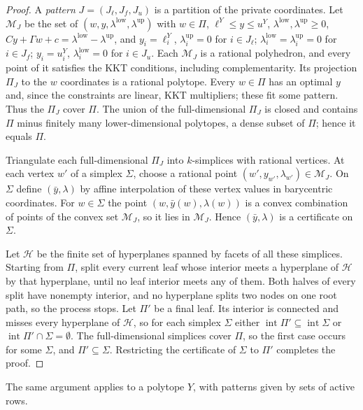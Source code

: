 \begin{proof}
A \emph{pattern} $J=(J_\ell,J_f,J_u)$ is a partition of the private
coordinates. Let $\mathcal M_J$ be the set of
$(w,y,\lambda^{\mathrm{low}},\lambda^{\mathrm{up}})$ with $w\in\Pi$,
$\ell^Y\le y\le u^Y$, $\lambda^{\mathrm{low}},\lambda^{\mathrm{up}}\ge0$,
$Cy+\Gamma w+c=\lambda^{\mathrm{low}}-\lambda^{\mathrm{up}}$, and
$y_i=\ell^Y_i$, $\lambda^{\mathrm{up}}_i=0$ for $i\in J_\ell$;
$\lambda^{\mathrm{low}}_i=\lambda^{\mathrm{up}}_i=0$ for $i\in J_f$;
$y_i=u^Y_i$, $\lambda^{\mathrm{low}}_i=0$ for $i\in J_u$. Each
$\mathcal M_J$ is a rational polyhedron, and every point of it satisfies the
KKT conditions, including complementarity. Its projection $\Pi_J$ to the $w$
coordinates is a rational polytope. Every $w\in\Pi$ has an optimal $y$ and,
since the constraints are linear, KKT multipliers; these fit some pattern.
Thus the $\Pi_J$ cover $\Pi$. The union of the full-dimensional $\Pi_J$ is
closed and contains $\Pi$ minus finitely many lower-dimensional polytopes, a
dense subset of $\Pi$; hence it equals $\Pi$.

Triangulate each full-dimensional $\Pi_J$ into $k$-simplices with rational
vertices. At each vertex $w'$ of a simplex $\Sigma$, choose a rational point
$(w',y_{w'},\lambda_{w'})\in\mathcal M_J$. On $\Sigma$ define
$(\bar y,\lambda)$ by affine interpolation of these vertex values in
barycentric coordinates. For $w\in\Sigma$ the point
$(w,\bar y(w),\lambda(w))$ is a convex combination of points of the convex
set $\mathcal M_J$, so it lies in $\mathcal M_J$. Hence $(\bar y,\lambda)$ is
a certificate on $\Sigma$.

Let $\mathcal H$ be the finite set of hyperplanes spanned by facets of all
these simplices. Starting from $\Pi$, split every current leaf whose interior
meets a hyperplane of $\mathcal H$ by that hyperplane, until no leaf interior
meets any of them. Both halves of every split have nonempty interior, and no
hyperplane splits two nodes on one root path, so the process stops. Let
$\Pi'$ be a final leaf. Its interior is connected and misses every hyperplane
of $\mathcal H$, so for each simplex $\Sigma$ either
$\operatorname{int}\Pi'\subseteq\operatorname{int}\Sigma$ or
$\operatorname{int}\Pi'\cap\Sigma=\emptyset$. The full-dimensional simplices
cover $\Pi$, so the first case occurs for some $\Sigma$, and
$\Pi'\subseteq\Sigma$. Restricting the certificate of $\Sigma$ to $\Pi'$
completes the proof.
\end{proof}

The same argument applies to a polytope $Y$, with patterns given by sets of
active rows.

